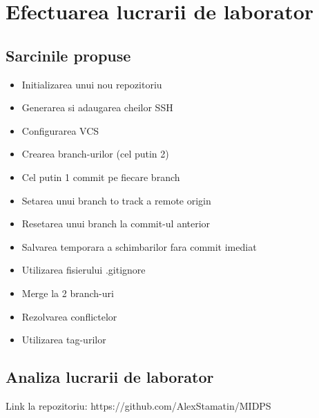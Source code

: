 \section{Efectuarea lucrarii de laborator}

\subsection{Sarcinile propuse}
\begin{itemize}
	\item Initializarea unui nou repozitoriu
	\item Generarea si adaugarea cheilor SSH
	\item Configurarea VCS 
	\item Crearea branch-urilor (cel putin 2)
	\item Cel putin 1 commit pe fiecare branch
	\item Setarea unui branch to track a remote origin
	\item Resetarea unui branch la commit-ul anterior
	\item Salvarea temporara a schimbarilor fara commit imediat
	\item Utilizarea fisierului .gitignore
	\item Merge la 2 branch-uri
	\item Rezolvarea conflictelor
	\item Utilizarea tag-urilor
\end{itemize}


\subsection{Analiza lucrarii de laborator}

Link la repozitoriu: https://github.com/AlexStamatin/MIDPS

